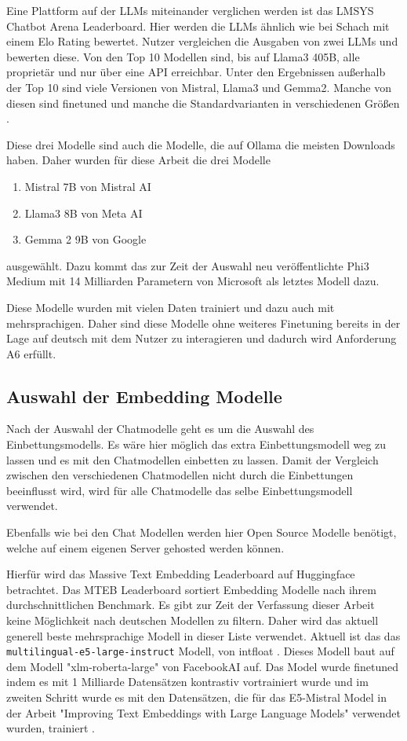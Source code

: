 \par Eine Plattform auf der LLMs miteinander verglichen werden ist 
das LMSYS Chatbot Arena Leaderboard. Hier werden die LLMs 
ähnlich wie bei Schach mit einem Elo Rating bewertet. Nutzer 
vergleichen die Ausgaben von zwei LLMs und bewerten diese.
Von den Top 10 Modellen sind, bis auf Llama3 405B, alle proprietär
und nur über eine API erreichbar. Unter den Ergebnissen außerhalb der Top 10 
sind viele Versionen von Mistral, Llama3 und Gemma2. Manche 
von diesen sind finetuned und manche die Standardvarianten in 
verschiedenen Größen \cite{chiang2024chatbot}.\par
Diese drei Modelle sind auch die Modelle, die auf Ollama die meisten Downloads haben. Daher wurden
für diese Arbeit die drei Modelle 
\begin{enumerate}
    \item Mistral 7B von Mistral AI 
    \item Llama3 8B von Meta AI  
    \item Gemma 2 9B von Google
\end{enumerate}
ausgewählt. Dazu kommt das zur Zeit der Auswahl neu veröffentlichte Phi3 Medium 
mit 14 Milliarden Parametern von 
Microsoft als letztes Modell dazu.\par

Diese Modelle wurden mit vielen Daten trainiert 
und dazu auch mit mehrsprachigen. Daher sind diese Modelle ohne weiteres Finetuning 
bereits in der Lage auf deutsch mit dem Nutzer zu interagieren und dadurch 
wird Anforderung A6 erfüllt. 

\subsection{Auswahl der Embedding Modelle}
\label{s:konz:emod}
Nach der Auswahl der Chatmodelle geht es um die Auswahl des Einbettungsmodells.
Es wäre hier möglich das extra Einbettungsmodell weg zu lassen und es mit den 
Chatmodellen einbetten zu lassen. Damit der Vergleich zwischen den verschiedenen 
Chatmodellen nicht durch die Einbettungen beeinflusst wird, wird für alle 
Chatmodelle das selbe Einbettungsmodell verwendet.\par
Ebenfalls wie bei den Chat Modellen werden hier Open Source Modelle benötigt, 
welche auf einem eigenen Server gehosted werden können.\par
Hierfür wird das Massive Text Embedding Leaderboard auf Huggingface betrachtet. 
Das MTEB Leaderboard sortiert Embedding Modelle nach ihrem durchschnittlichen Benchmark.
Es gibt zur Zeit der Verfassung dieser Arbeit keine Möglichkeit nach deutschen Modellen 
zu filtern. Daher wird das aktuell generell beste mehrsprachige Modell in dieser Liste verwendet.
Aktuell ist das das \verb|multilingual-e5-large-instruct| Modell, von intfloat \cite{IntfloatMultilinguale5largeinstructHugging}. 
Dieses Modell baut auf dem Modell
"xlm-roberta-large" von FacebookAI auf. Das Model wurde finetuned
indem es mit 1 Milliarde Datensätzen kontrastiv vortrainiert wurde und im 
zweiten Schritt wurde es mit den Datensätzen, die für das E5-Mistral Model in der Arbeit 
"Improving Text Embeddings with Large Language Models" verwendet wurden, trainiert \cite{wangMultilingualE5Text2024}.

